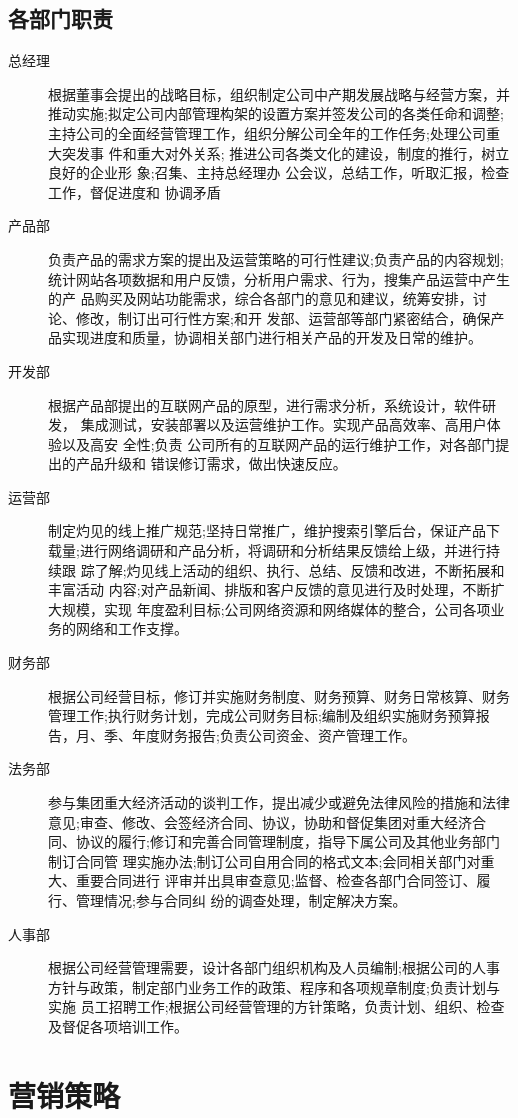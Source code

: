 \documentclass[UTF8]{ctexart}
\begin{document}
\subsection{各部门职责}
\begin{description}
	\item[总经理]根据董事会提出的战略目标，组织制定公司中产期发展战略与经营方案，并 推动实施;拟定公司内部管理构架的设置方案并签发公司的各类任命和调整;主持公司的全面经营管理工作，组织分解公司全年的工作任务;处理公司重大突发事 件和重大对外关系; 推进公司各类文化的建设，制度的推行，树立良好的企业形 象;召集、主持总经理办 公会议，总结工作，听取汇报，检查工作，督促进度和 协调矛盾
	\item[产品部]负责产品的需求方案的提出及运营策略的可行性建议;负责产品的内容规划; 统计网站各项数据和用户反馈，分析用户需求、行为，搜集产品运营中产生的产 品购买及网站功能需求，综合各部门的意见和建议，统筹安排，讨论、修改，制订出可行性方案;和开 发部、运营部等部门紧密结合，确保产品实现进度和质量，协调相关部门进行相关产品的开发及日常的维护。
	\item[开发部]根据产品部提出的互联网产品的原型，进行需求分析，系统设计，软件研发， 集成测试，安装部署以及运营维护工作。实现产品高效率、高用户体验以及高安 全性;负责 公司所有的互联网产品的运行维护工作，对各部门提出的产品升级和 错误修订需求，做出快速反应。
	\item[运营部]制定灼见的线上推广规范;坚持日常推广，维护搜索引擎后台，保证产品下 载量;进行网络调研和产品分析，将调研和分析结果反馈给上级，并进行持续跟 踪了解;灼见线上活动的组织、执行、总结、反馈和改进，不断拓展和丰富活动 内容;对产品新闻、排版和客户反馈的意见进行及时处理，不断扩大规模，实现 年度盈利目标;公司网络资源和网络媒体的整合，公司各项业务的网络和工作支撑。
	\item[财务部]根据公司经营目标，修订并实施财务制度、财务预算、财务日常核算、财务管理工作;执行财务计划，完成公司财务目标;编制及组织实施财务预算报告，月、季、年度财务报告;负责公司资金、资产管理工作。
	\item[法务部]参与集团重大经济活动的谈判工作，提出减少或避免法律风险的措施和法律 意见;审查、修改、会签经济合同、协议，协助和督促集团对重大经济合同、协议的履行;修订和完善合同管理制度，指导下属公司及其他业务部门制订合同管 理实施办法;制订公司自用合同的格式文本;会同相关部门对重大、重要合同进行 评审并出具审查意见;监督、检查各部门合同签订、履行、管理情况;参与合同纠 纷的调查处理，制定解决方案。
	\item[人事部]根据公司经营管理需要，设计各部门组织机构及人员编制;根据公司的人事方针与政策，制定部门业务工作的政策、程序和各项规章制度;负责计划与实施 员工招聘工作;根据公司经营管理的方针策略，负责计划、组织、检查及督促各项培训工作。
\end{description}
\newpage\section{营销策略}
\end{document}
